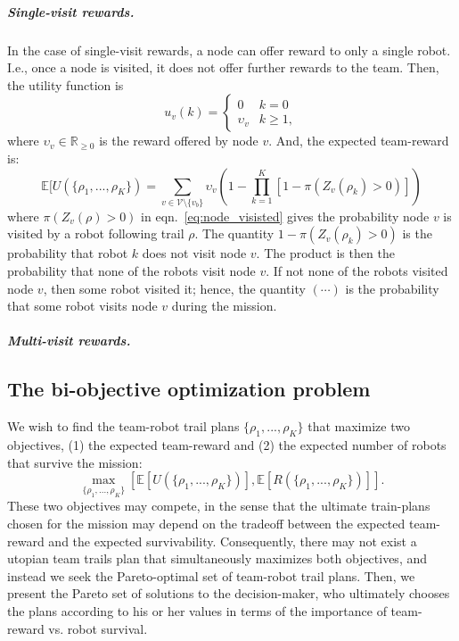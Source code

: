 \documentclass[11pt, oneside]{article}
\begin{document}
\subparagraph{Single-visit rewards.}
In the case of single-visit rewards, a node can offer reward to only a single robot. I.e., once a node is visited, it does not offer further rewards to the team. Then, the utility function is
\begin{equation}
	u_v(k) = \begin{cases}
		0 & k = 0 \\
		\upsilon_v & k \geq 1,
	\end{cases}
\end{equation} where $\upsilon_v \in \mathbb{R}_{\geq 0}$ is the reward offered by node $v$. And, the expected team-reward is:
\begin{equation}
	\mathbb{E}[U(\{\rho_1, ..., \rho_K\}) = \sum_{v \in \mathcal{V} \setminus \{v_b\}} \upsilon_v \left(1 - \prod_{k=1}^K [1 - \pi(Z_v(\rho_k) >0)] \right)
\end{equation} where $\pi(Z_v(\rho) >0)$ in eqn.~\ref{eq:node_visisted} gives the probability node $v$ is visited by a robot following trail $\rho$. 
The quantity $1 - \pi(Z_v(\rho_k) >0)$ is the probability that robot $k$ does not visit node $v$. The product is then the probability that none of the robots visit node $v$. If not none of the robots visited node $v$, then some robot visited it; hence, the quantity $(\cdots)$ is the probability that some robot visits node $v$ during the mission.

\subparagraph{Multi-visit rewards.}

\subsection{The bi-objective optimization problem}
We wish to find the team-robot trail plans $\{\rho_1, ..., \rho_K\}$ that maximize two objectives, (1) the expected team-reward and (2) the expected number of robots that survive the mission:
\begin{equation}
\max_{\{\rho_1, ..., \rho_K\}} [\mathbb{E}[U(\{\rho_1, ..., \rho_K\})], \mathbb{E}[R(\{\rho_1, ..., \rho_K\})]].
\end{equation}
These two objectives may compete, in the sense that the ultimate train-plans chosen for the mission may depend on the tradeoff between the expected team-reward and the expected survivability. Consequently, there may not exist a utopian team trails plan that simultaneously maximizes both objectives, and instead we seek the Pareto-optimal set of team-robot trail plans. Then, we present the Pareto set of solutions to the decision-maker, who ultimately chooses the plans according to his or her values in terms of the importance of team-reward vs. robot survival. 
\end{document}

